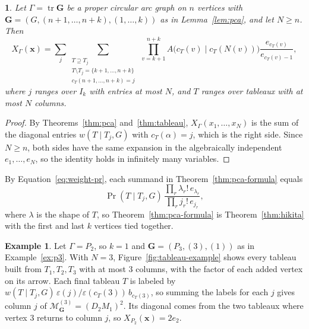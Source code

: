 \documentclass[12pt]{article}
\theoremstyle{plain}
\newtheorem*{restatedthm}{\restatedthmname}
\newcommand{\restatedthmname}{}
\newenvironment{restated}[1]{\renewcommand{\restatedthmname}{Theorem~\ref{#1}}\begin{restatedthm}}{\end{restatedthm}}
\theoremstyle{definition}
\newtheorem{example}[theorem]{Example}
\theoremstyle{remark}
\newcommand{\bG}{\mathbf{G}}
\begin{document}
\begin{restated}{thm:pca-formula}
Let $\Gamma=\operatorname{tr}\bG$ be a proper circular arc graph on $n$
vertices with $\bG=(G,(n+1,\dots,n+k),(1,\dots,k))$ as in
Lemma~\ref{lem:pca}, and let $N\ge n$. Then
\[
X_\Gamma(\bm x)=\sum_j\sum_{\substack{T\supseteq T_j\\
 T\setminus T_j=\{k+1,\dots,n+k\}\\ c_T(n+1,\dots,n+k)=j}}\
 \prod_{v=k+1}^{n+k}
 A\bigl(c_T(v)\mid c_T(N(v))\bigr)\frac{e_{c_T(v)}}{e_{c_T(v)-1}},
\]
where $j$ ranges over $I_k$ with entries at most $N$, and $T$ ranges
over tableaux with at most $N$ columns.
\end{restated}

\begin{proof}
By Theorems~\ref{thm:pca} and~\ref{thm:tableau}, $X_\Gamma(x_1,\dots,x_N)$
is the sum of the diagonal entries $w(T\mid T_j,G)$ with
$c_T(\alpha)=j$, which is the right side. Since $N\ge n$, both sides have
the same expansion in the algebraically independent $e_1,\dots,e_N$, so
the identity holds in infinitely many variables.
\end{proof}

By Equation~\eqref{eq:weight-pr}, each summand in
Theorem~\ref{thm:pca-formula} equals
\[
\Pr(T\mid T_j,G)\,
 \frac{\prod_r\lambda_r!\,e_{\lambda_r}}{\prod_rj_r!\,e_{j_r}},
\]
where $\lambda$ is the shape of $T$, so Theorem~\ref{thm:pca-formula} is
Theorem~\ref{thm:hikita} with the first and last $k$ vertices tied
together.

\begin{example}\label{ex:pca-formula}
Let $\Gamma=P_2$, so $k=1$ and $\bG=(P_3,(3),(1))$ as in Example~\ref{ex:p3}. With $N=3$, Figure~\ref{fig:tableau-example} shows every tableau built from $T_1,T_2,T_3$ with at most $3$ columns, with the factor of each added vertex on its arrow. Each final tableau $T$ is labeled by $w(T\mid T_j,G)\,\varepsilon(j)/\varepsilon(c_T(3))\,b_{c_T(3)}$, so summing the labels for each $j$ gives column $j$ of $\mathcal M_\bG^{(3)}=(D_2M_1)^2$. Its diagonal comes from the two tableaux where vertex $3$ returns to column $j$, so $X_{P_2}(\bm x)=2e_2$.
\end{example}
\end{document}
